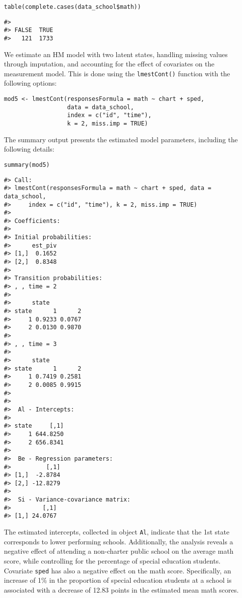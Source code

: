\begin{verbatim}
table(complete.cases(data_school$math))
\end{verbatim}

\begin{verbatim}
#> 
#> FALSE  TRUE 
#>   121  1733
\end{verbatim}

We estimate an HM model with two latent states, handling missing values
through imputation, and accounting for the effect of covariates on the
measurement model. This is done using the \texttt{lmestCont()} function with
the following options:

\begin{verbatim}
mod5 <- lmestCont(responsesFormula = math ~ chart + sped,
                  data = data_school,
                  index = c("id", "time"),
                  k = 2, miss.imp = TRUE)
\end{verbatim}

The summary output presents the estimated model parameters, including
the following details:

\begin{verbatim}
summary(mod5)
\end{verbatim}

\begin{verbatim}
#> Call:
#> lmestCont(responsesFormula = math ~ chart + sped, data = data_school, 
#>     index = c("id", "time"), k = 2, miss.imp = TRUE)
#> 
#> Coefficients:
#> 
#> Initial probabilities:
#>      est_piv
#> [1,]  0.1652
#> [2,]  0.8348
#> 
#> Transition probabilities:
#> , , time = 2
#> 
#>      state
#> state      1      2
#>     1 0.9233 0.0767
#>     2 0.0130 0.9870
#> 
#> , , time = 3
#> 
#>      state
#> state      1      2
#>     1 0.7419 0.2581
#>     2 0.0085 0.9915
#> 
#> 
#>  Al - Intercepts:
#>      
#> state     [,1]
#>     1 644.8250
#>     2 656.8341
#> 
#>  Be - Regression parameters:
#>          [,1]
#> [1,]  -2.8784
#> [2,] -12.8279
#> 
#>  Si - Variance-covariance matrix:
#>         [,1]
#> [1,] 24.0767
\end{verbatim}

The estimated intercepts, collected in object \texttt{Al}, indicate that the
1st state corresponds to lower performing schools. Additionally, the
analysis reveals a negative effect of attending a non-charter public
school on the average math score, while controlling for the percentage
of special education students. Covariate \texttt{sped} has also a negative
effect on the math score. Specifically, an increase of 1\% in the
proportion of special education students at a school is associated with
a decrease of 12.83 points in the estimated mean math scores.

